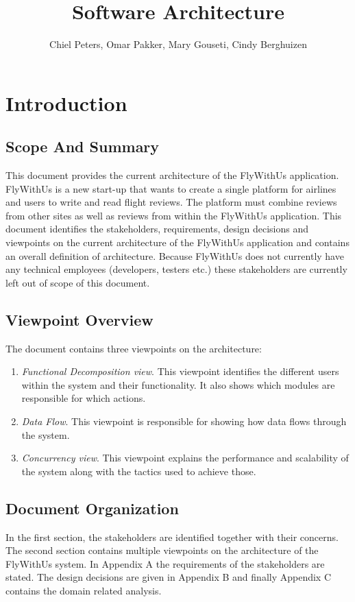 \documentclass{article}
\begin{document}
\title{Software Architecture}
\author{Chiel Peters, Omar Pakker, Mary Gouseti, Cindy Berghuizen}
\maketitle

\tableofcontents

\setlength\parindent{0pt}

\section{Introduction}
\subsection{Scope And Summary}
This document provides the current architecture of the FlyWithUs application. FlyWithUs is a new start-up that wants to create a single platform for airlines and users to write and read flight reviews. The platform must combine reviews from other sites as well as reviews from within the FlyWithUs application.
This document identifies the stakeholders, requirements, design decisions and viewpoints on the current architecture of the FlyWithUs application and contains an overall definition of architecture. Because FlyWithUs does not currently have any technical employees (developers, testers etc.) these stakeholders are currently left out of scope of this document.
 
\subsection{Viewpoint Overview}
The document contains three viewpoints on the architecture:
\begin{enumerate}
\item \emph{Functional Decomposition view}. This viewpoint identifies the different users within the system and their functionality. It also shows which modules are responsible for which actions.
\item \emph{Data Flow}. This viewpoint is responsible for showing how data flows through the system.
\item \emph{Concurrency view}. This viewpoint explains the performance and scalability of the system along with the tactics used to achieve those.
\end{enumerate}
 
\subsection{Document Organization}
In the first section, the stakeholders are identified together with their concerns.
The second section contains multiple viewpoints on the architecture of the FlyWithUs system. In Appendix A the requirements of the stakeholders are stated. The design decisions are given in Appendix B and finally Appendix C contains the domain related analysis.
\end{document}
